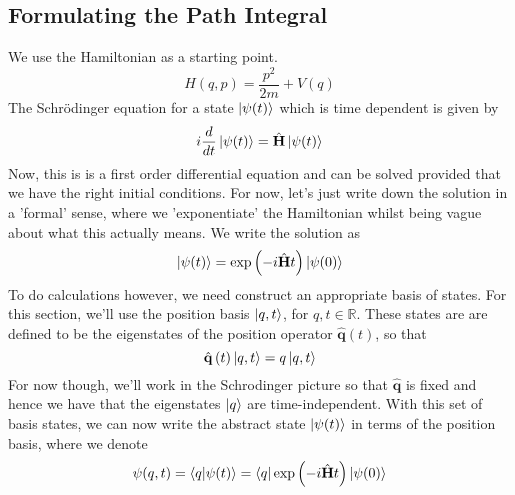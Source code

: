 \documentclass[11pt, oneside]{article}   	%
\theoremstyle{slanted}
\renewcommand{\op}[1]{\hat{\mathbf{#1}}}
\begin{document}
\subsection{Formulating the Path Integral} 
We use the Hamiltonian 
as a starting point. 
\[
	H ( q, p ) = \frac{p ^ 2 }{ 2m } + V ( q ) 
\] The Schrödinger equation for 
a state $ \ket{ \psi ( t ) } $ which is time dependent 
is given by 
\[
	i \frac{ d }{ dt } \ket{ \psi ( t ) }  = \op{H }  \ket{ \psi ( t ) } 
\] Now, this is 
is a first order differential equation 
and can be solved provided that 
we have the right initial conditions. 
For now, let's just write down the solution 
in a 'formal' sense, where we 'exponentiate' 
the Hamiltonian whilst being vague 
about what this actually means. 
We write the solution as 
\[
	\ket{ \psi ( t ) } = \exp\left(  - i \op{ H } t  \right)  
	\ket{ \psi ( 0 ) } 
\] To do calculations however, we 
need construct an appropriate basis of states.
For this section, we'll use 
the position basis $ \ket{ q , t } $, for 
$ q, t  \in \mathbb{ R } $. These states are 
are defined to be the eigenstates of 
the position operator $ \op{q} \left( t  \right)  $, 
so that 
\[
	\op{q } \left( t   \right) \ket{ q , t }  = q \ket { q , t }   
\] For now though, we'll work in 
the Schrodinger picture so that $ \op{q } $ is fixed
and hence we have that the eigenstates $ \ket{ q } $ 
are time-independent.
With this set of basis states, we can 
now write the abstract state $ \ket{ \psi( t ) } $ 
in terms of the position basis, where we denote 
\[
	\psi ( q, t ) = \bra{ q}\ket{ \psi  ( t ) } 
	=  \bra{q } \exp\left(  - i \op{H }t  \right)\ket{ \psi ( 0 ) } 
\]  
\end{document}
